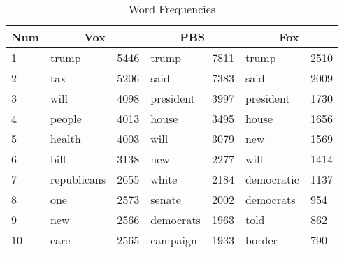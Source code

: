 \begin{table}[H]
    \centering
    \begin{tabular}{|l|ll|ll|ll|} \hline
    Num & \multicolumn{2}{c|}{Vox} & \multicolumn{2}{c|}{PBS} & \multicolumn{2}{c|}{Fox} \\ \hline \hline
    1   & trump       & 5446 & trump     & 7811 & trump      & 2510 \\
    2   & tax         & 5206 & said      & 7383 & said       & 2009 \\
    3   & will        & 4098 & president & 3997 & president  & 1730 \\
    4   & people      & 4013 & house     & 3495 & house      & 1656 \\
    5   & health      & 4003 & will      & 3079 & new        & 1569 \\
    6   & bill        & 3138 & new       & 2277 & will       & 1414 \\
    7   & republicans & 2655 & white     & 2184 & democratic & 1137 \\
    8   & one         & 2573 & senate    & 2002 & democrats  & 954  \\
    9   & new         & 2566 & democrats & 1963 & told       & 862  \\
    10  & care        & 2565 & campaign  & 1933 & border     & 790 \\ \hline
    \end{tabular}
    \caption{Word Frequencies}
    \label{tab:1gram}
\end{table}